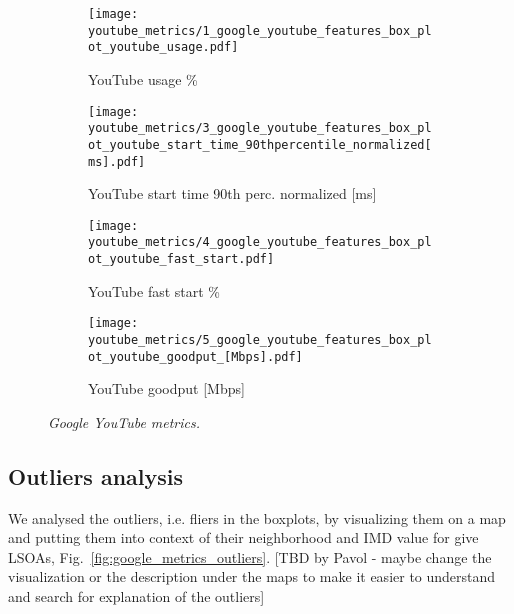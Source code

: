 \begin{figure}
\centering
	\begin{subfigure}[b]{0.4	\linewidth}
		\texttt{[image: youtube\_metrics/1\_google\_youtube\_features\_box\_plot\_youtube\_usage.pdf]}
		\caption{\scriptsize{YouTube usage \%\\\hspace{\textwidth}}}
	\end{subfigure}
	\begin{subfigure}[b]{0.45	\linewidth}
		\texttt{[image: youtube\_metrics/3\_google\_youtube\_features\_box\_plot\_youtube\_start\_time\_90thpercentile\_normalized[ms].pdf]}
		\caption{\scriptsize{YouTube start time 90th perc. normalized [ms]}}
	\end{subfigure}
	
	\hspace{0.1cm}
	\begin{subfigure}[b]{0.37	\linewidth}
		\texttt{[image: youtube\_metrics/4\_google\_youtube\_features\_box\_plot\_youtube\_fast\_start.pdf]}
		\caption{\scriptsize{YouTube fast start \%}}
	\end{subfigure}
	\begin{subfigure}[b]{0.45	\linewidth}
		\texttt{[image: youtube\_metrics/5\_google\_youtube\_features\_box\_plot\_youtube\_goodput\_[Mbps].pdf]}
		\caption{\scriptsize{YouTube goodput [Mbps]}}
		\label{fig:google_youtube_metrics_goodput}
	\end{subfigure}
\caption{\textit{Google YouTube metrics.}}
\label{fig:google_youtube_metrics}
\end{figure}

\subsection{Outliers analysis}

We analysed the outliers, i.e. fliers in the boxplots, by visualizing them on a map and putting them into context of their neighborhood and IMD value for give LSOAs, Fig.~\ref{fig:google_metrics_outliers}.
[TBD by Pavol - maybe change the visualization or the description under the maps to make it easier to understand and search for explanation of the outliers]

